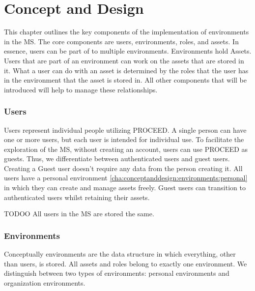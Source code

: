 \chapter{Concept and Design}
\label{cha:conceptanddesign}

This chapter outlines the key components of the implementation of environments in the MS.
The core components are users, environments, roles, and assets.
In essence, users can be part of to multiple environments.
Environments hold Assets.
Users that are part of an environment can work on the assets that are stored in it.
What a user can do with an asset is determined by the roles that the user has in the
environment that the asset is stored in.
All other components that will be introduced will help to manage these relationships.

\subsection{Users}
\label{cha:conceptanddesign:users}

Users represent individual people utilizing PROCEED.
A single person can have one or more users, but each user is intended for individual use.
To facilitate the exploration of the MS, without creating an account, users
can use PROCEED as guests.
Thus, we differentiate between authenticated users and guest users.
Creating a Guest user doesn't require any data from the person creating it.
All users have a personal environment \ref{cha:conceptanddesign:environments:personal} %
in which they can create and manage assets freely.
Guest users can transition to authenticated users whilst retaining their assets.


TODOO
All users in the MS are stored the same.


%

\subsection{Environments}
\label{cha:conceptanddesign:environments}

Conceptually environments are the data structure in which everything, other than users, is
stored.
All assets and roles belong to exactly one environment.
We distinguish between two types of environments: personal environments and organization
environments.

